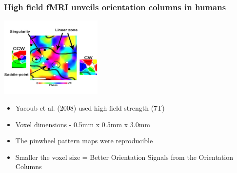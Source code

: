 \documentclass{beamer}
\begin{document}
 \begin{frame}
    \frametitle{High field fMRI unveils orientation columns in humans}
        \begin{center}
            \includegraphics[height=4cm]{../pictures/Yacoub_pinwheel}
        \end{center}
        \begin{itemize}
            \item Yacoub et al. (2008) used high field strength (7T)
            \item Voxel dimensions - 0.5mm x 0.5mm x 3.0mm
            \item The pinwheel pattern maps were reproducible
            \item Smaller the voxel size = Better Orientation Signals from the Orientation Columns
        \end{itemize}  
    \end{frame}





\end{document}
